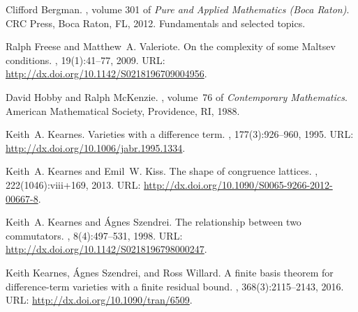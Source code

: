 \begin{thebibliography}{1}
Clifford Bergman.
, volume 301 of {\em Pure and Applied
  Mathematics (Boca Raton)}.
\newblock CRC Press, Boca Raton, FL, 2012.
\newblock Fundamentals and selected topics.

Ralph Freese and Matthew~A. Valeriote.
\newblock On the complexity of some {M}altsev conditions.
, 19(1):41--77, 2009.
\newblock URL: \url{http://dx.doi.org/10.1142/S0218196709004956}.%

David Hobby and Ralph McKenzie.
, volume~76 of {\em
  Contemporary Mathematics}.
\newblock American Mathematical Society, Providence, RI, 1988.

Keith~A. Kearnes.
\newblock Varieties with a difference term.
, 177(3):926--960, 1995.
\newblock URL: \url{http://dx.doi.org/10.1006/jabr.1995.1334}.%

Keith~A. Kearnes and Emil~W. Kiss.
\newblock The shape of congruence lattices.
, 222(1046):viii+169, 2013.
\newblock URL: \url{http://dx.doi.org/10.1090/S0065-9266-2012-00667-8}.%

Keith~A. Kearnes and {\'A}gnes Szendrei.
\newblock The relationship between two commutators.
, 8(4):497--531, 1998.
\newblock URL: \url{http://dx.doi.org/10.1142/S0218196798000247}.%

Keith Kearnes, {\'A}gnes Szendrei, and Ross Willard.
\newblock A finite basis theorem for difference-term varieties with a finite
  residual bound.
, 368(3):2115--2143, 2016.
\newblock URL: \url{http://dx.doi.org/10.1090/tran/6509}.%



\end{thebibliography}
